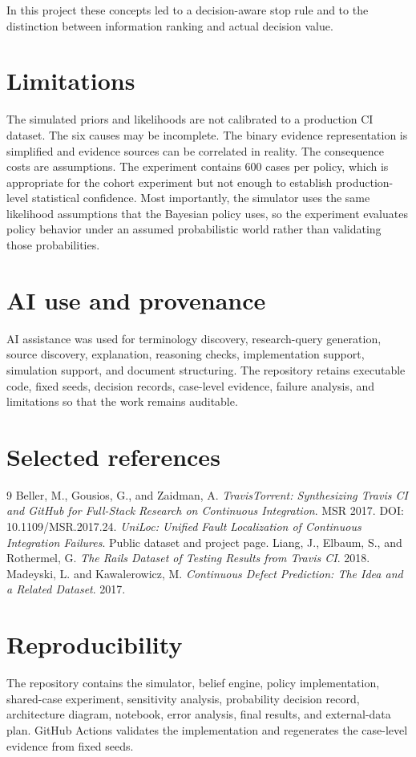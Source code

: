 \documentclass[11pt]{article}
\begin{document}
In this project these concepts led to a decision-aware stop rule and to the distinction between information ranking and actual decision value.

\section{Limitations}
The simulated priors and likelihoods are not calibrated to a production CI dataset. The six causes may be incomplete. The binary evidence representation is simplified and evidence sources can be correlated in reality. The consequence costs are assumptions. The experiment contains 600 cases per policy, which is appropriate for the cohort experiment but not enough to establish production-level statistical confidence. Most importantly, the simulator uses the same likelihood assumptions that the Bayesian policy uses, so the experiment evaluates policy behavior under an assumed probabilistic world rather than validating those probabilities.

\section{AI use and provenance}
AI assistance was used for terminology discovery, research-query generation, source discovery, explanation, reasoning checks, implementation support, simulation support, and document structuring. The repository retains executable code, fixed seeds, decision records, case-level evidence, failure analysis, and limitations so that the work remains auditable.

\section{Selected references}
\begin{thebibliography}{9}
 Beller, M., Gousios, G., and Zaidman, A. \emph{TravisTorrent: Synthesizing Travis CI and GitHub for Full-Stack Research on Continuous Integration}. MSR 2017. DOI: 10.1109/MSR.2017.24.
 \emph{UniLoc: Unified Fault Localization of Continuous Integration Failures}. Public dataset and project page.
 Liang, J., Elbaum, S., and Rothermel, G. \emph{The Rails Dataset of Testing Results from Travis CI}. 2018.
 Madeyski, L. and Kawalerowicz, M. \emph{Continuous Defect Prediction: The Idea and a Related Dataset}. 2017.
\end{thebibliography}

\section{Reproducibility}
The repository contains the simulator, belief engine, policy implementation, shared-case experiment, sensitivity analysis, probability decision record, architecture diagram, notebook, error analysis, final results, and external-data plan. GitHub Actions validates the implementation and regenerates the case-level evidence from fixed seeds.
\end{document}
